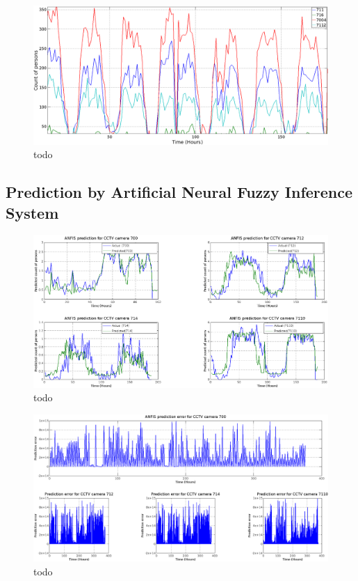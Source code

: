 \begin{figure}
\centering
\includegraphics[width=\textwidth]{Figures/Figure_PersonCount_Hours.png}
 \caption{todo}
\end{figure}

\subsection{Prediction by Artificial Neural Fuzzy Inference System}

\begin{figure}
\centering
\includegraphics[width=\textwidth]{Figures/Figure_Prediction.png}
 \caption{todo}
\end{figure}

\begin{figure}
\centering
\includegraphics[width=\textwidth]{Figures/Figure_PredictionError.png}
 \caption{todo}
\end{figure}

